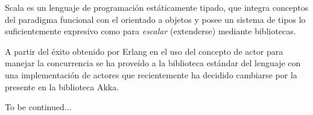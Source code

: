 
Scala es un lenguaje de programación estáticamente tipado, que integra conceptos del paradigma funcional con el orientado a objetos y posee un sistema de tipos lo suficientemente expresivo como para {\em escalar} (extenderse) mediante bibliotecas.

A partir del éxito obtenido por Erlang en el uso del concepto de actor para manejar la concurrencia se ha proveído a la biblioteca estándar del lenguaje con una implementación de actores que recientemente ha decidido cambiarse por la presente en la biblioteca Akka.


To be continued...
